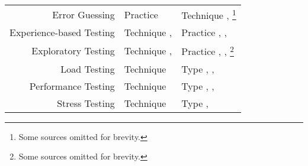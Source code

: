 \begin{paperTable}
\begin{minipage}{\linewidth}
\begin{tabular}{|r|l|l|}
            Error Guessing           & Practice \cite[p.~33]{IEEE2013}                                     & Technique \cite[pp.~4, 34, Fig.~2]{IEEE2022}, \cite[Fig.~2, Tab.~A.2]{IEEE2021c}\footnote{Some sources omitted for brevity.}                    \\ %
            Experience-based Testing & Technique \cite[pp.~46, 50]{Firesmith2015}, \cite[Fig.~2]{IEEE2022} & Practice \cite[Fig.~2]{IEEE2022}, \cite[p.~viii]{IEEE2021c}, \cite[pp.~iii, 31, 33]{IEEE2013}                                                   \\
            Exploratory Testing      & Technique \cite[p.~50]{Firesmith2015}, \cite[p.~5\=/14]{SWEBOK2024} & Practice \cite[pp.~11, 20, 34, Fig.~2]{IEEE2022}, \cite[p.~viii]{IEEE2021c}, \cite[p.~5]{IEEE2021a}\footnote{Some sources omitted for brevity.} \\ %
            Load Testing             & Technique \cite[pp.~38\==39]{IEEE2021c}                             & Type \cite[p.~253]{IEEE2017}, \cite[pp.~5, 20, 22]{IEEE2022}, \cite{ISTQB}                                                                      \\
            Performance Testing      & Technique \cite[pp.~38\==39]{IEEE2021c}                             & Type \cite[pp.~7, 22, 26\==27]{IEEE2022}, \cite[p.~7]{IEEE2021c}, \cite[pp.~2, 8]{IEEE2021a}                                                    \\
            Stress Testing           & Technique \cite[pp.~38\==39]{IEEE2021c}                             & Type \cite[p.~442]{IEEE2017}, \cite[pp.~9, 22]{IEEE2022}                                                                                        \\
            \hline
        \end{tabular}
    \end{minipage}
\end{paperTable}

